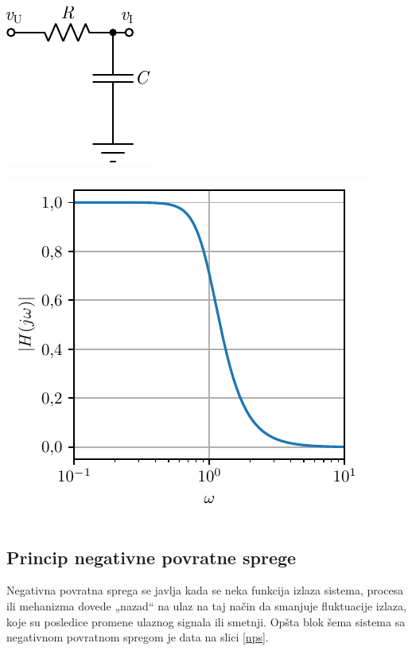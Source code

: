 \documentclass[a4paper, 12pt, diplomski]{etf}
\newcommand{\navod}[1]{„#1“}
\begin{document}
\begin{center}
\begin{minipage}{0.5\textwidth}
\centering
\includegraphics[scale=1]{fig/NF.pdf}
\label{NFfiltar}
\end{minipage}%
\begin{minipage}{0.5\textwidth}
\centering
\includegraphics[scale=1]{fig_teorija/NFkka.pdf} 
\label{NFprenosna} 
\end{minipage}
\end{center}


\subsection{Princip negativne povratne sprege}

Negativna povratna sprega se javlja kada se neka funkcija izlaza sistema, procesa ili mehanizma dovede \navod{nazad} na ulaz na taj način da smanjuje fluktuacije izlaza, koje su posledice promene ulaznog signala ili smetnji. Opšta blok šema sistema sa negativnom povratnom spregom je data na slici \ref{nps}.
\end{document}
